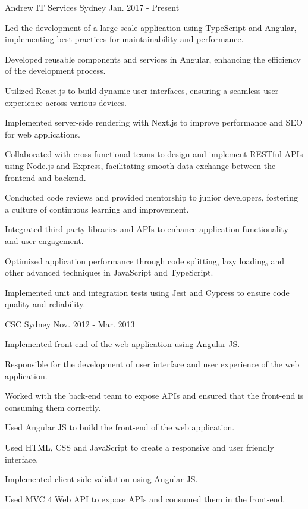 \begin{cventries}
  {Andrew IT Services} %
  {Sydney} %
  {Jan. 2017 - Present} %
  { \begin{cvitems} %
    \item {Led the development of a large-scale application using TypeScript and Angular, implementing best practices for maintainability and performance.}
    \item {Developed reusable components and services in Angular, enhancing the efficiency of the development process.}
    \item {Utilized React.js to build dynamic user interfaces, ensuring a seamless user experience across various devices.}
    \item {Implemented server-side rendering with Next.js to improve performance and SEO for web applications.}
    \item {Collaborated with cross-functional teams to design and implement RESTful APIs using Node.js and Express, facilitating smooth data exchange between the frontend and backend.}
    \item {Conducted code reviews and provided mentorship to junior developers, fostering a culture of continuous learning and improvement.}
    \item {Integrated third-party libraries and APIs to enhance application functionality and user engagement.}
    \item {Optimized application performance through code splitting, lazy loading, and other advanced techniques in JavaScript and TypeScript.}
    \item {Implemented unit and integration tests using Jest and Cypress to ensure code quality and reliability.}
    \end{cvitems} }

  {CSC} %
  {Sydney} %
  {Nov. 2012 - Mar. 2013} %
  { \begin{cvitems} %
    \item {Implemented front-end of the web application using Angular JS.}
    \item {Responsible for the development of user interface and user experience of the web application.}
    \item {Worked with the back-end team to expose APIs and ensured that the front-end is consuming them correctly.}
    \item {Used Angular JS to build the front-end of the web application.}
    \item {Used HTML, CSS and JavaScript to create a responsive and user friendly interface.}
    \item {Implemented client-side validation using Angular JS.}
    \item {Used MVC 4 Web API to expose APIs and consumed them in the front-end.}
  \end{cvitems} }


\end{cventries}
